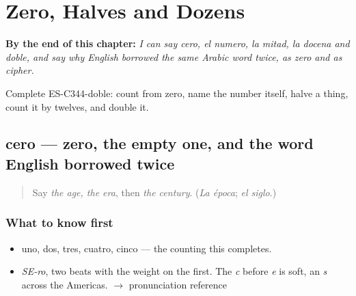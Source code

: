 
\chapter{Zero, Halves and Dozens}
\label{ch:cero-y-mitad}

\begin{chapteropening}
\textbf{By the end of this chapter:} \emph{I can say cero, el numero, la mitad, la docena and doble, and say why English borrowed the same Arabic word twice, as zero and as cipher.}

Complete ES-C344-doble: count from zero, name the number itself, halve a thing, count it by twelves, and double it.
\end{chapteropening}

\section[cero]{cero — zero, the empty one, and the word English borrowed twice}

\label{lesson:ES-C344-cero}



\begin{quote}
Say \emph{the age, the era}, then \emph{the century}. (\emph{La época}; \emph{el siglo}.)
\end{quote}

\subsection*{What to know first}
\begin{itemize}
\raggedright
  \item uno, dos, tres, cuatro, cinco — the counting this completes.
\end{itemize}

\begin{sounds}
\begin{itemize}
\raggedright
  \item \emph{SE-ro}, two beats with the weight on the first. The \emph{c} before \emph{e} is soft, an \emph{s} across the Americas. $\to$ pronunciation reference
\end{itemize}
\end{sounds}

